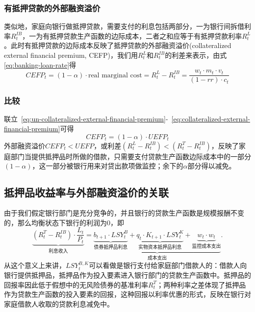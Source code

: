 \subsubsection{有抵押贷款的外部融资溢价}
类似地，家庭向银行做抵押贷款，需要支付的利息包括两部分，一为银行间拆借利率$R_t^{IB}$，一为有抵押贷款生产函数的边际成本，二者之和应等于有抵押贷款利率$R_t^L$。此时有抵押贷款的边际成本反映了抵押贷款的外部融资溢价(collateralized external financial premium, CEFP)，我们用$R_t^L$和$R_t^{IB}$的利差来表示，由式\eqref{eq:banking-loan-rate}得
\begin{equation}
  \label{eq:collateralized-external-financial-premium}
  CEFP_t = (1-\alpha) \cdot \text{real marginal cost} = R_t^L - R_t^{IB} =\frac{w_t \cdot m_t \cdot v_t }{(1-rr) \cdot c_t}
\end{equation}

\subsubsection{比较}
联立~\eqref{eq:un-collateralized-external-financial-premium}-~\eqref{eq:collateralized-external-financial-premium}可得
\begin{equation}
  \label{eq:banking-efp-connection}
  CEFP_t = (1-\alpha) \cdot UEFP_t
\end{equation}
外部融资溢价$CEFP_t< UEFP$，或利差$ (R_t^L-R_t^{IB})<(R_t^{T}-R_t^{IB})$，反映了家庭部门当提供抵押品时所做的借款，只需要支付贷款生产函数边际成本中的一部分$(1-\alpha)$，这一部分被银行用来对贷出款项做监控；余下的$\alpha$部分得以减免。

\subsection{抵押品收益率与外部融资溢价的关联}
由于我们假定银行部门是充分竞争的，并且银行的贷款生产函数是规模报酬不变的，那么均衡状态下银行的利润为$0$，即
\begin{equation*}
\underbrace{(R_t^{T}-R_t^{IB}) \cdot \frac{L_t}{P_t}}_{\text{利息收入}} = \underbrace{\underbrace{b_{t+1} \cdot LSY_t^{B}}_{\text{债券抵押品利息}} + \underbrace{q_t \cdot K_{t+1} \cdot LSY_t^K}_{\text{实物资本抵押品利息}} + \underbrace{w_{t} \cdot w_t}_{\text{监控成本支出}}}_{\text{成本支出}}.
\end{equation*}
从这个意义上来讲，$LSY_{t}^{B,K}$可以看做是银行支付给家庭部门借款人的：借款人向银行提供抵押品，抵押品作为投入要素进入银行部门的贷款生产函数中。抵押品的回报率因此低于假想中的无风险债券的基准利率$R_t^T$；两种利率之差体现了抵押品作为贷款生产函数的投入要素的回报，这种回报以利率优惠的形式，反映在银行对家庭借款人收取的贷款利息减免中。

